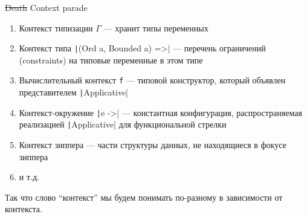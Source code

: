     \begin{frame}{\st{Death} Context parade \popslide}
        \begin{enumerate}
            \item Контекст типизации $\Gamma$ --- хранит типы переменных
            \item Контекст типа \texttt|(Ord a, Bounded a) =>| --- перечень ограничений (constraints) на типовые переменные в этом типе
            \item Вычислительный контекст \texttt{f} --- типовой конструктор, который объявлен представителем \texttt|Applicative|
            \item Контекст-окружение \texttt|e ->| --- константная конфигурация, распространяемая реализацией \texttt|Applicative| для функциональной стрелки
            \item Контекст зиппера --- части структуры данных, не находящиеся в фокусе зиппера
            \item и т.д.
        \end{enumerate}
        \vspace{0.5em}
        Так что слово ``контекст'' мы будем понимать по-разному в зависимости от контекста.
    \end{frame}


